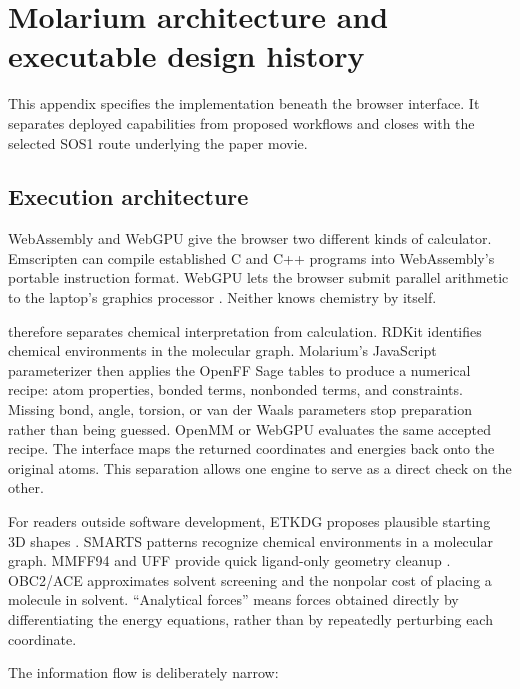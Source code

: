 \section{Molarium architecture and executable design history}
\label{app:architecture}

This appendix specifies the implementation beneath the browser interface. It
separates deployed capabilities from proposed workflows and closes with the
selected SOS1 route underlying the paper movie.

\subsection{Execution architecture}
\label{app:wasm-webgpu}

WebAssembly and WebGPU give the browser two different kinds of calculator.
Emscripten can compile established C and C++ programs into WebAssembly's portable
instruction format. WebGPU lets the browser submit parallel arithmetic to the
laptop's graphics processor
\cite{haas2017webassembly,w3c2025webgpu,w3c2026wgsl}. Neither knows chemistry by
itself.

\molarium{} therefore separates chemical interpretation from calculation. RDKit
identifies chemical environments in the molecular graph. Molarium's JavaScript
parameterizer then applies the OpenFF Sage tables to produce a numerical recipe:
atom properties, bonded terms, nonbonded terms, and constraints. Missing bond,
angle, torsion, or van der Waals parameters stop preparation rather than being
guessed. OpenMM or WebGPU evaluates the same accepted recipe. The interface maps
the returned coordinates and energies back onto the original atoms. This
separation allows one engine to serve as a direct check on the other.

For readers outside software development, ETKDG proposes plausible starting 3D
shapes \cite{riniker2015etkdg,wang2020etkdg}. SMARTS
patterns recognize chemical environments in a molecular graph. MMFF94 and UFF
provide quick ligand-only geometry cleanup
\cite{halgren1996mmff,rappe1992uff}. OBC2/ACE approximates solvent screening and
the nonpolar cost of placing a molecule in solvent. ``Analytical forces'' means
forces obtained directly by differentiating the energy equations, rather than
by repeatedly perturbing each coordinate.

The information flow is deliberately narrow:

